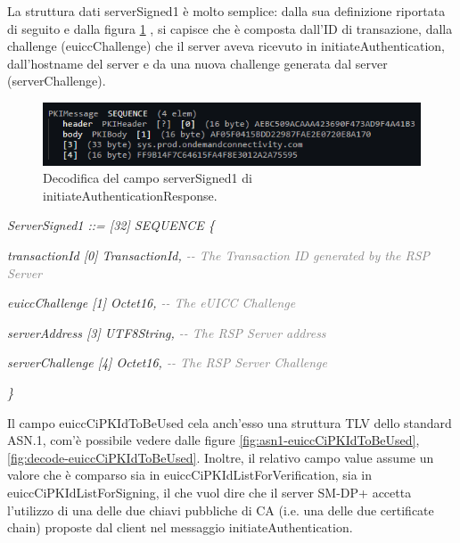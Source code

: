 \documentclass[10pt, oneside]{book}
\begin{document}
\noindent La struttura dati serverSigned1 è molto semplice: dalla sua definizione riportata di seguito e dalla figura \ref{fig:decode-serverSigned1} \cite{RSP-definitions}, si capisce che è composta dall'ID di transazione, dalla challenge (euiccChallenge) che il server aveva ricevuto in initiateAuthentication, dall'hostname del server e da una nuova challenge generata dal server (serverChallenge).\\
\begin{figure}
\includegraphics[width=\linewidth]{decode-serverSigned1.png}
\caption{Decodifica del campo serverSigned1 di initiateAuthenticationResponse.}
\label{fig:decode-serverSigned1}
\end{figure}

\textit{ServerSigned1 ::= [32] SEQUENCE \{}

\hspace{0.75cm} \textit{transactionId [0] TransactionId, \textcolor{gray}{{-}{-} The Transaction ID generated by the RSP Server}}

\hspace{0.75cm} \textit{euiccChallenge [1] Octet16, \textcolor{gray}{{-}{-} The eUICC Challenge}}

\hspace{0.75cm} \textit{serverAddress [3] UTF8String, \textcolor{gray}{{-}{-} The RSP Server address}}

\hspace{0.75cm} \textit{serverChallenge [4] Octet16, \textcolor{gray}{{-}{-} The RSP Server Challenge}}

\textit{\}\\}

\noindent Il campo euiccCiPKIdToBeUsed cela anch'esso una struttura TLV dello standard ASN.1, com'è possibile vedere dalle figure \ref{fig:asn1-euiccCiPKIdToBeUsed}, \ref{fig:decode-euiccCiPKIdToBeUsed}. Inoltre, il relativo campo value assume un valore che è comparso sia in euiccCiPKIdListForVerification, sia in euiccCiPKIdListForSigning, il che vuol dire che il server SM-DP+ accetta l'utilizzo di una delle due chiavi pubbliche di CA (i.e. una delle due certificate chain) proposte dal client nel messaggio initiateAuthentication.\\
\end{document}
